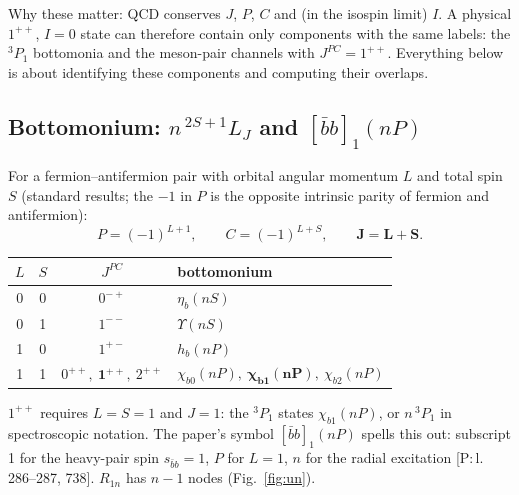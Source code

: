 \documentclass[11pt,a4paper]{article}
\newcommand{\tagP}[1]{\textcolor{blue!65!black}{\textsf{\small[P:\,#1]}}}
\renewcommand{\bbnP}{[\bar bb]_1(nP)}
\begin{document}
Why these matter: QCD conserves $J$, $P$, $C$ and (in the isospin limit) $I$. A physical $1^{++}$, $I=0$ state can therefore contain only components with the same labels: the $^3P_1$ bottomonia and the meson-pair channels with $J^{PC}=1^{++}$. Everything below is about identifying these components and computing their overlaps.

\subsection{Bottomonium: $n\,^{2S+1}L_J$ and $[\bar bb]_1(nP)$}
\label{sec:qn-bb}

For a fermion--antifermion pair with orbital angular momentum $L$ and total spin $S$ (standard results; the $-1$ in $P$ is the opposite intrinsic parity of fermion and antifermion):
\begin{equation}
P=(-1)^{L+1},\qquad C=(-1)^{L+S},\qquad \bm J=\bm L+\bm S .
\end{equation}
\begin{center}
\small
\begin{tabular}{cccl}
\toprule
$L$ & $S$ & $J^{PC}$ & bottomonium\\
\midrule
0 & 0 & $0^{-+}$ & $\eta_b(nS)$\\
0 & 1 & $1^{--}$ & $\Upsilon(nS)$\\
1 & 0 & $1^{+-}$ & $h_b(nP)$\\
1 & 1 & $0^{++},\ \bm{1^{++}},\ 2^{++}$ & $\chi_{b0}(nP),\ \bm{\chi_{b1}(nP)},\ \chi_{b2}(nP)$\\
\bottomrule
\end{tabular}
\end{center}
$1^{++}$ requires $L=S=1$ and $J=1$: the $^3P_1$ states $\chi_{b1}(nP)$, or $n\,^3P_1$ in spectroscopic notation. The paper's symbol $\bbnP$ spells this out: subscript 1 for the heavy-pair spin $s_{\bar bb}=1$, $P$ for $L=1$, $n$ for the radial excitation \tagP{l.\,286--287, 738}. $R_{1n}$ has $n-1$ nodes (Fig.~\ref{fig:un}).
\end{document}
